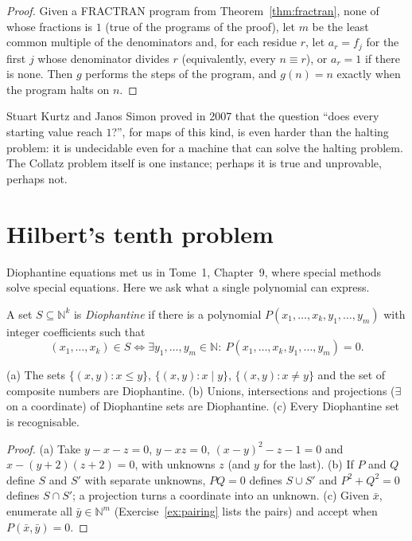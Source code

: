 \begin{proof}
Given a FRACTRAN program from Theorem~\ref{thm:fractran}, none of whose fractions is $1$ (true of the programs of the proof), let $m$ be the least common multiple of the denominators and, for each residue $r$, let $a_r=f_j$ for the first $j$ whose denominator divides $r$ (equivalently, every $n\equiv r$), or $a_r=1$ if there is none. Then $g$ performs the steps of the program, and $g(n)=n$ exactly when the program halts on $n$.
\end{proof}

Stuart Kurtz and Janos Simon proved in 2007 that the question ``does every starting value reach $1$?'', for maps of this kind, is even harder than the halting problem: it is undecidable even for a machine that can solve the halting problem. The Collatz problem itself is one instance; perhaps it is true and unprovable, perhaps not.

\section{Hilbert's tenth problem}\label{sec:hilbert10}

Diophantine equations met us in Tome~1, Chapter~9, where special methods solve special equations. Here we ask what a single polynomial can express.

\begin{definition}\label{def:diophantine}
A set $S\subseteq\mathbb N^k$ is \emph{Diophantine} if there is a polynomial $P(x_1,\dots,x_k,y_1,\dots,y_m)$ with integer coefficients such that
\[
(x_1,\dots,x_k)\in S\iff\exists y_1,\dots,y_m\in\mathbb N:\ P(x_1,\dots,x_k,y_1,\dots,y_m)=0.
\]
\end{definition}

\begin{proposition}\label{prop:dioph}
\textup{(a)} The sets $\{(x,y):x\le y\}$, $\{(x,y):x\mid y\}$, $\{(x,y):x\ne y\}$ and the set of composite numbers are Diophantine. \textup{(b)} Unions, intersections and projections ($\exists$ on a coordinate) of Diophantine sets are Diophantine. \textup{(c)} Every Diophantine set is recognisable.
\end{proposition}

\begin{proof}
(a) Take $y-x-z=0$, $y-xz=0$, $(x-y)^2-z-1=0$ and $x-(y+2)(z+2)=0$, with unknowns $z$ (and $y$ for the last). (b) If $P$ and $Q$ define $S$ and $S'$ with separate unknowns, $PQ=0$ defines $S\cup S'$ and $P^2+Q^2=0$ defines $S\cap S'$; a projection turns a coordinate into an unknown. (c) Given $\bar x$, enumerate all $\bar y\in\mathbb N^m$ (Exercise~\ref{ex:pairing} lists the pairs) and accept when $P(\bar x,\bar y)=0$.
\end{proof}

